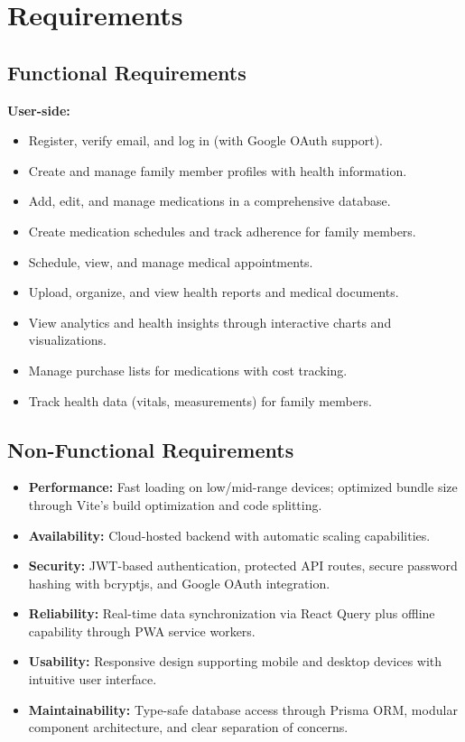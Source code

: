 \documentclass[12pt, a4paper]{report}
\begin{document}
\section{Requirements}

\subsection{Functional Requirements}
\textbf{User-side:}
\begin{itemize}
    \item Register, verify email, and log in (with Google OAuth support).
    \item Create and manage family member profiles with health information.
    \item Add, edit, and manage medications in a comprehensive database.
    \item Create medication schedules and track adherence for family members.
    \item Schedule, view, and manage medical appointments.
    \item Upload, organize, and view health reports and medical documents.
    \item View analytics and health insights through interactive charts and visualizations.
    \item Manage purchase lists for medications with cost tracking.
    \item Track health data (vitals, measurements) for family members.
\end{itemize}

\subsection{Non-Functional Requirements}
\begin{itemize}
    \item \textbf{Performance:} Fast loading on low/mid-range devices; optimized bundle size through Vite's build optimization and code splitting.
    \item \textbf{Availability:} Cloud-hosted backend with automatic scaling capabilities.
    \item \textbf{Security:} JWT-based authentication, protected API routes, secure password hashing with bcryptjs, and Google OAuth integration.
    \item \textbf{Reliability:} Real-time data synchronization via React Query plus offline capability through PWA service workers.
    \item \textbf{Usability:} Responsive design supporting mobile and desktop devices with intuitive user interface.
    \item \textbf{Maintainability:} Type-safe database access through Prisma ORM, modular component architecture, and clear separation of concerns.
\end{itemize}
\end{document}
